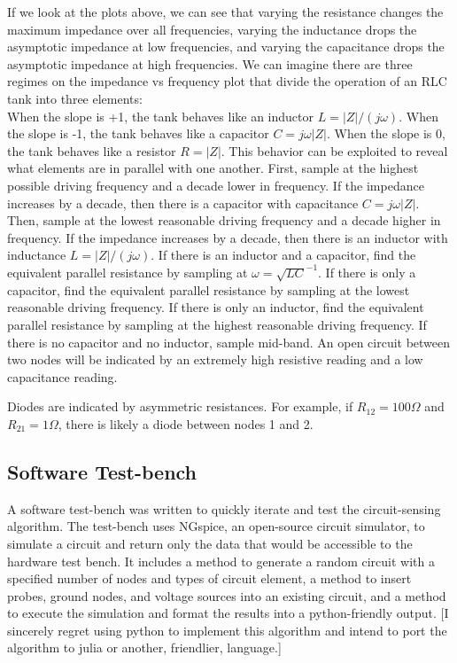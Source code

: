 \documentclass[11pt, a4paper]{article}
\begin{document}
If we look at the plots above, we can see that varying the resistance changes the maximum impedance over all frequencies, varying the inductance drops the asymptotic impedance at low frequencies, and varying the capacitance drops the asymptotic impedance at high frequencies.
We can imagine there are three regimes on the impedance vs frequency plot that divide the operation of an RLC tank into three elements:\\
When the slope is +1, the tank behaves like an inductor
$L=|Z|/(j\omega)$.
When the slope is -1, the tank behaves like a capacitor
$C=j\omega |Z|$.
When the slope is 0, the tank behaves like a resistor
$R=|Z|$.
This behavior can be exploited to reveal what elements are in parallel with one another.
First, sample at the highest possible driving frequency and a decade lower in frequency.
If the impedance increases by a decade, then there is a capacitor with capacitance $C=j\omega |Z|$.
Then, sample at the lowest reasonable driving frequency and a decade higher in frequency.
If the impedance increases by a decade, then there is an inductor with inductance $L=|Z|/(j\omega)$.
If there is an inductor and a capacitor, find the equivalent parallel resistance by sampling at $\omega=\sqrt{LC}^{-1}$.
If there is only a capacitor, find the equivalent parallel resistance by sampling at the lowest reasonable driving frequency.
If there is only an inductor, find the equivalent parallel resistance by sampling at the highest reasonable driving frequency.
If there is no capacitor and no inductor, sample mid-band.
An open circuit between two nodes will be indicated by an extremely high resistive reading and a low capacitance reading.

Diodes are indicated by asymmetric resistances.
For example, if $R_{12}=100\Omega$ and $R_{21}=1\Omega$, there is likely a diode between nodes 1 and 2.

\subsection{Software Test-bench}

A software test-bench was written to quickly iterate and test the circuit-sensing algorithm.
The test-bench uses NGspice, an open-source circuit simulator, to simulate a circuit and return only the data that would be accessible to the hardware test bench.
It includes a method to generate a random circuit with a specified number of nodes and types of circuit element, a method to insert probes, ground nodes, and voltage sources into an existing circuit, and a method to execute the simulation and format the results into a python-friendly output.
[I sincerely regret using python to implement this algorithm and intend to port the algorithm to julia or another, friendlier, language.]
\end{document}
